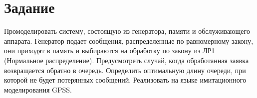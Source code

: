 \chapter{Задание}

Промоделировать систему, состоящую из генератора, памяти и обслуживающего аппарата.
Генератор подает сообщения, распределенные по равномерному закону, они приходят в память и выбираются на обработку по закону из ЛР1 (Нормальное распределение).
Предусмотреть случай, когда обработанная заявка возвращается обратно в очередь.
Определить оптимальную длину очереди, при которой не будет потерянных сообщений.
Реализовать на языке имитационного моделирования GPSS.